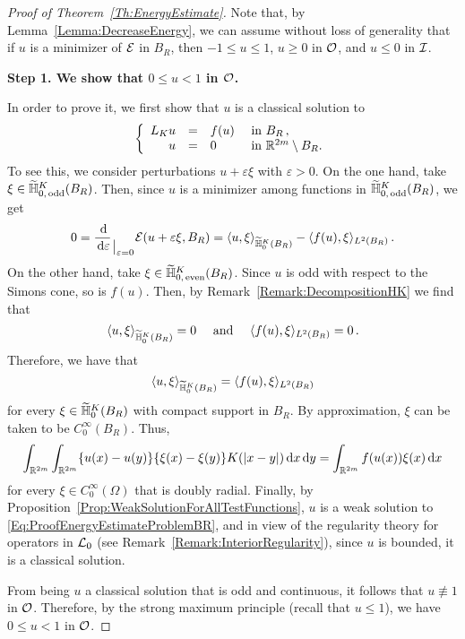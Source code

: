 \begin{proof}[Proof of Theorem~\ref{Th:EnergyEstimate}]

Note that, by Lemma~\ref{Lemma:DecreaseEnergy},  we can assume without loss of generality that if $u$ is a minimizer of $\mathcal{E}$ in $B_R$, then $-1 \leq u \leq 1$, $u \geq 0$ in $\mathcal{O}$, and $u \leq 0$ in $\mathcal{I}$. 

\textbf{Step 1. We show that $0\leq u < 1$ in $\mathcal{O}$.} 

In order to prove it, we first show that $u$ is a classical solution to
\begin{equation}
\label{Eq:ProofEnergyEstimateProblemBR}
	\left\{\begin{array}{rcll}
	L_K  u &=& f(u) & \textrm{ in } B_R\,,\\
	u &=& 0 & \textrm{ in }\mathbb{R}^{2m} \setminus B_R.
	\end{array} \right.
\end{equation}
To see this, we consider perturbations $u +  \varepsilon \xi$ with $\varepsilon>0$. On the one hand, take $\xi \in \widetilde{\mathbb{H}}^K_{0, \,\mathrm{odd}}(B_R)$. Then, since $u$ is a minimizer among functions in $\widetilde{\mathbb{H}}^K_{0, \,\mathrm{odd}}(B_R)$, we get
$$
0 = \dfrac{\,\mathrm{d}}{\,\mathrm{d} \varepsilon}_{\mkern1.5mu\big\vert_{\scriptstyle \varepsilon = 0}} \mathcal{E}(u +  \varepsilon \xi, B_R) = \langle u,\xi \rangle_{\widetilde{\mathbb{H}}^K_0(B_R)} - \langle f(u),\xi \rangle_{L^2(B_R)}\,.
$$
On the other hand, take $\xi \in \widetilde{\mathbb{H}}^K_{0, \,\mathrm{even}}(B_R)$. Since $u$ is odd with respect to the Simons cone, so is $f(u)$. Then, by Remark~\ref{Remark:DecompositionHK} we find that
$$
\langle u,\xi \rangle_{\widetilde{\mathbb{H}}^K_0(B_R)} = 0 \quad \textrm{ and } \quad  \langle f(u),\xi \rangle_{L^2(B_R)} = 0\,.
$$
Therefore, we have that
$$
\langle u,\xi \rangle_{\widetilde{\mathbb{H}}^K_0(B_R)} = \langle f(u),\xi \rangle_{L^2(B_R)}
$$
for every $\xi \in\widetilde{\mathbb{H}}^K_0(B_R)$ with compact support in  $B_R$. By approximation, $\xi$ can be taken to be $C^\infty_0(B_R)$. Thus,
$$
\int_{\mathbb{R}^{2m}}\int_{\mathbb{R}^{2m}} \{u(x)-u(y)\}\{\xi(x)-\xi(y)\} K(|x-y|) \,\mathrm{d} x \,\mathrm{d} y = \int_{\mathbb{R}^{2m}} f(u(x)) \xi(x) \,\mathrm{d} x
$$
for every $\xi \in C^\infty_0(\Omega)$ that is doubly radial. Finally, by Proposition~\ref{Prop:WeakSolutionForAllTestFunctions}, $u$ is a weak solution to \eqref{Eq:ProofEnergyEstimateProblemBR}, and in view of the regularity theory for operators in $\mathcal{L}_0$ (see Remark~\ref{Remark:InteriorRegularity}), since $u$ is bounded, it is a classical solution.

From being $u$ a classical solution that is odd and continuous, it follows that $u \not \equiv 1$ in $\mathcal{O}$. Therefore, by the strong maximum principle (recall that $u\leq 1$), we have $0\leq u < 1$ in $\mathcal{O}$. 


\end{proof}
